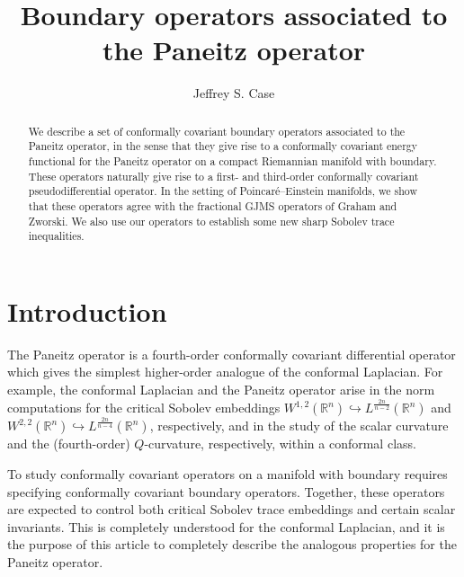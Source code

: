 \documentclass{amsart}
\theoremstyle{definition}
\theoremstyle{remark}
\numberwithin{equation}{section}
\begin{document}
\title{Boundary operators associated to the Paneitz operator}
\author{Jeffrey S. Case}
\address{109 McAllister Building \\ Penn State University \\ University Park, PA 16801}
\begin{abstract}
We describe a set of conformally covariant boundary operators associated to the Paneitz operator, in the sense that they give rise to a conformally covariant energy functional for the Paneitz operator on a compact Riemannian manifold with boundary.  These operators naturally give rise to a first- and third-order conformally covariant pseudodifferential operator.  In the setting of Poincar\'e--Einstein manifolds, we show that these operators agree with the fractional GJMS operators of Graham and Zworski.  We also use our operators to establish some new sharp Sobolev trace inequalities.
\end{abstract}
\maketitle

\section{Introduction}
\label{sec:intro}

The Paneitz operator is a fourth-order conformally covariant differential operator which gives the simplest higher-order analogue of the conformal Laplacian.  For example, the conformal Laplacian and the Paneitz operator arise in the norm computations for the critical Sobolev embeddings $W^{1,2}({\mathbb{R}}^n)\hookrightarrow L^{\frac{2n}{n-2}}({\mathbb{R}}^n)$ and $W^{2,2}({\mathbb{R}}^n)\hookrightarrow L^{\frac{2n}{n-4}}({\mathbb{R}}^n)$, respectively, and in the study of the scalar curvature and the (fourth-order) $Q$-curvature, respectively, within a conformal class.

To study conformally covariant operators on a manifold with boundary requires specifying conformally covariant boundary operators.  Together, these operators are expected to control both critical Sobolev trace embeddings and certain scalar invariants.  This is completely understood for the conformal Laplacian, and it is the purpose of this article to completely describe the analogous properties for the Paneitz operator.
\end{document}
